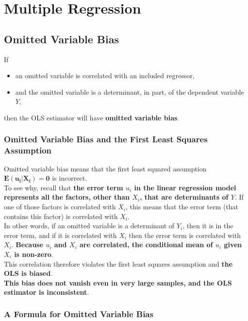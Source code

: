 \chapter{Multiple Regression}


\section{Omitted Variable Bias}
If
\begin{itemize}
	\item an omitted variable is correlated with an included regressor, 
	\item and the omitted variable is a determinant, in part, of the dependent variable $Y$, 
\end{itemize}
then the OLS estimator will have \textbf{\color{blue}omitted variable bias}.\\

\subsection{Omitted Variable Bias and the First Least Squares Assumption}
Omitted variable bias means that the first least squared assumption  $\mathbf{E\left(u_{i}\vert X_{i}\right) = 0}$ is incorrect.\\
To see why, recall that \textbf{\color{blue}the error term $u_{i}$ in the linear regression model represents all the factors, other than $X_{i}$, that are determinants of $Y$}. If one of those factors is correlated with $X_{i}$, this means that the error term (that contains this factor) is correlated with $X_{i}$.\\
In other words, if an omitted variable is a determinant of $Y_{i}$, then it is in the error term, and if it is correlated with $X_{i}$ then the error term is correlated with $X_{i}$. \textbf{\color{blue}Because $u_{i}$ and $X_{i}$ are correlated, the conditional mean of $u_{i}$ given $X_{i}$ is non-zero}.\\
This correlation therefore violates the first least squares assumption and \textbf{\color{red}the OLS is biased}.\\
\textbf{\color{blue}This bias does not vanish even in very large samples, and the OLS estimator is \color{red}inconsistent}.

\subsection{A Formula for Omitted Variable Bias}

